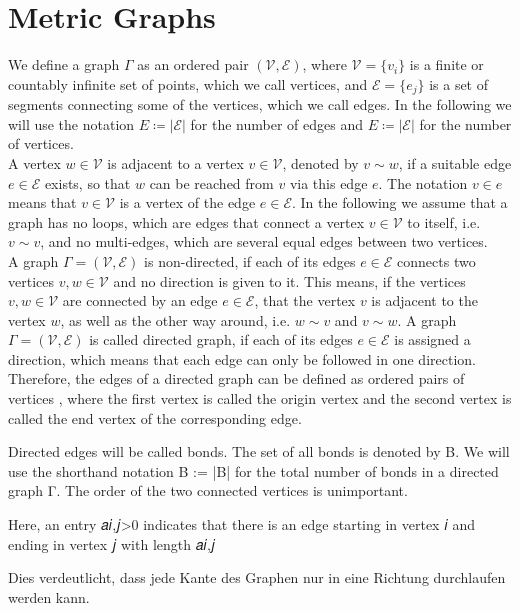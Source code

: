 \section{Metric Graphs}

We define a graph $\Gamma$ as an ordered pair $(\mathcal{V}, \mathcal{E})$, where $\mathcal{V} = \{v_i\}$ is a finite or countably infinite set of points, which we call vertices, and $\mathcal{E} = \{e_j\}$ is a set of segments connecting some of the vertices, which we call edges. In the following we will use the notation $E \coloneqq \left\lvert \mathcal{E} \right\rvert$ for the number of edges and $E \coloneqq \left\lvert \mathcal{E} \right\rvert$ for the number of vertices. \\
A vertex $w \in \mathcal{V}$ is adjacent to a vertex $v \in \mathcal{V}$, denoted by $v \sim w$, if a suitable edge $e \in \mathcal{E}$ exists, so that $w$ can be reached from $v$ via this edge $e$. The notation $v \in e$ means that $v \in \mathcal{V}$ is a vertex of the edge $e \in \mathcal{E}$. In the following we assume that a graph has no loops, which are edges that connect a vertex $v \in \mathcal{V}$ to itself, i.e. $v \sim v$, and no multi-edges, which are several equal edges between two vertices. \\
A graph $\Gamma = (\mathcal{V}, \mathcal{E})$ is non-directed, if each of its edges $e \in \mathcal{E}$ connects two vertices $v, w \in \mathcal{V}$ and no direction is given to it. This means, if the vertices $v, w \in \mathcal{V}$ are connected by an edge $e \in \mathcal{E}$, that the vertex $v$ is adjacent to the vertex $w$, as well as the other way around, i.e. $w \sim v$ and $v \sim w$. A graph $\Gamma = (\mathcal{V}, \mathcal{E})$ is called directed graph, if each of its edges $e \in \mathcal{E}$ is assigned a direction, which means that each edge can only be followed in one direction. Therefore, the edges of a directed graph can be defined as ordered pairs of vertices , where the first vertex is called the origin vertex and the second vertex is called the end vertex of the corresponding edge. 

Directed edges will be called bonds. The set of all bonds is denoted by B. We will use the shorthand notation B := |B| for the total number of bonds in a directed graph Γ.
The order of the two connected vertices is unimportant.

Here, an entry  𝑎𝑖,𝑗>0  indicates that there is an edge starting in vertex  𝑖  and ending in vertex  𝑗  with length  𝑎𝑖,𝑗 


Dies verdeutlicht, dass jede Kante des Graphen nur in eine Richtung durchlaufen werden kann.

